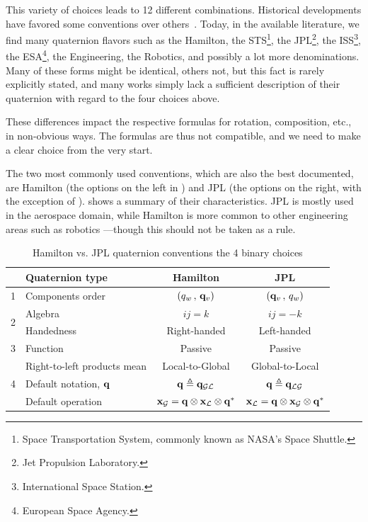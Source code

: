 This variety of choices leads to 12 different combinations. Historical developments have favored some conventions over others~\citep{CHOU-92,yazell-09}. 
Today, in the available literature, we find many quaternion flavors such as 
the Hamilton, 
the STS\footnote{Space Transportation System, commonly known as NASA's Space Shuttle.}, 
the JPL\footnote{Jet Propulsion Laboratory.}, 
the ISS\footnote{International Space Station.}, 
the ESA\footnote{European Space Agency.}, 
the Engineering, 
the Robotics, 
and possibly a lot more denominations. 
Many of these forms might be identical, others not, but this fact is rarely explicitly stated, 
and many works simply lack a sufficient description of their quaternion with regard to the four choices above.

These differences impact the respective formulas for rotation, composition, etc., in non-obvious ways. 
The formulas are thus not compatible, and we need to make a clear choice from the very start.

The two most commonly used conventions, which are also the best documented, are Hamilton (the options on the left in ) and JPL  (the options on the right, with the exception of ).  
 shows a summary of their characteristics. 
JPL is mostly used in the aerospace domain, while Hamilton is more common to other engineering areas such as robotics ---though this should not be taken as a rule.


\begin{table}
\renewcommand{\arraystretch}{1.3}
\centering
\caption{Hamilton vs. JPL quaternion conventions \wrt the 4 binary choices}
\vspace{1ex}
\begin{tabular}{|cl|c|c|}
\hline
& Quaternion type & Hamilton & JPL \\
\hline\hline
1 & Components order & $(q_w \,,\, {\bf q}_v)$ & $({\bf q}_v \,,\, q_w)$ \\
\hline
\multirow{2}{*}{2} & Algebra & $ij=k$ & $ij=-k$ \\
& Handedness & Right-handed & Left-handed \\
\hline
3 & Function & Passive & Passive
\\
\hline
\multirow{3}{*}{4} & Right-to-left products mean & Local-to-Global & Global-to-Local \\
& Default notation, ${\bf q}$ & ${\bf q} \triangleq {\bf q}_{\mathcal{G}\mathcal{L}}$ & ${\bf q} \triangleq {\bf q}_{\mathcal{L}\mathcal{G}}$ \\
& Default operation & ${\bf x}_{\mathcal{G}} = {\bf q}\otimes{\bf x}_{\mathcal{L}}\otimes{\bf q}^*$ & ${\bf x}_{\mathcal{L}} = {\bf q}\otimes{\bf x}_{\mathcal{G}}\otimes{\bf q}^*$ \\
\hline
\end{tabular}
\label{tab:Hamilton_vs_JPL}
\end{table}

